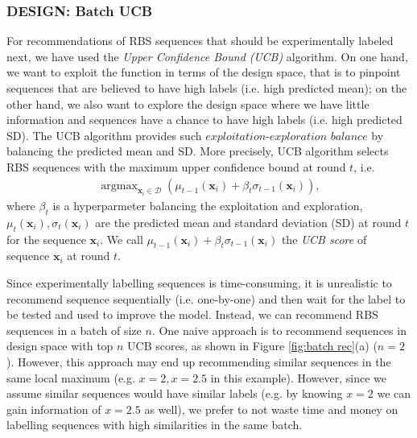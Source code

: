 \subsubsection{DESIGN: Batch UCB}

For recommendations of RBS sequences that should be experimentally labeled next, we have used the \textit{Upper Confidence Bound (UCB)} algorithm.
On one hand, we want to exploit the function in terms of the design space, that is to pinpoint sequences that are believed to have high labels (i.e. high predicted mean); 
on the other hand, we also want to explore the design space where we have little information and sequences have a chance to have high labels (i.e. high predicted SD).
The UCB algorithm provides such $\textit{exploitation-exploration balance}$ by balancing the predicted mean and SD.
More precisely, UCB algorithm selects RBS sequences with the maximum upper confidence bound at round $t$, i.e.
\begin{align}
\label{Eq: GPUCB}
    \operatorname{argmax}_{\mathbf{x}_i \in \mathcal{D}} \left( \mu_{t-1}(\mathbf{x}_i) + \beta_t \sigma_{t-1}(\mathbf{x}_i)\right),
\end{align}
where $\beta_t$ is a hyperparmeter balancing the exploitation and exploration, 
$\mu_t(\mathbf{x}_i), \sigma_t(\mathbf{x}_i)$ are the predicted mean and standard deviation (SD) at round $t$ for the sequence $\mathbf{x}_i$.
We call $\mu_{t-1}(\mathbf{x}_i) + \beta_t \sigma_{t-1}(\mathbf{x}_i)$ the \textit{UCB score} of sequence $\mathbf{x}_i$ at round $t$.

Since experimentally labelling sequences is time-consuming, it is unrealistic to recommend sequence sequentially (i.e. one-by-one) and then wait for the label to be tested and used to improve the model.
Instead, we can recommend RBS sequences in a batch of size $n$. 
One naive approach is to 
recommend sequences in design space with top $n$ UCB scores, as shown in Figure \ref{fig:batch rec}(a) ($n = 2$).
However, this approach may end up recommending similar sequences in the same local maximum (e.g. $x = 2, x =2.5$ in this example). 
However, since we assume similar sequences would have similar labels (e.g. by knowing $x=2$ we can gain information of $x=2.5$ as well), we prefer to not waste time and money on labelling sequences with high similarities in the same batch.

